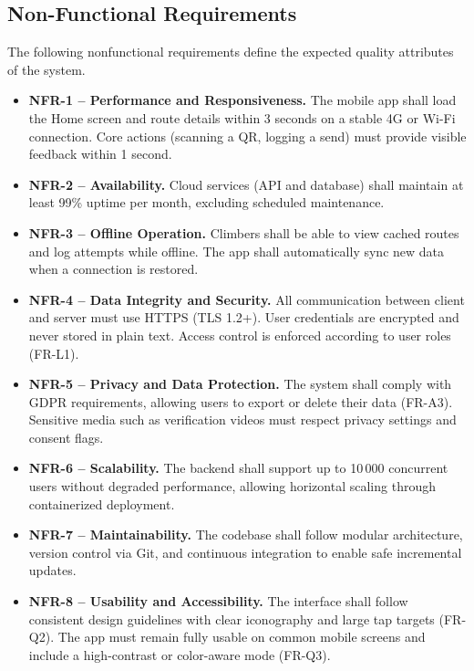 \documentclass[12pt,a4paper]{report}
\renewcommand\_{\textunderscore\hspace{0pt}}
\begin{document}
\subsection{Non-Functional Requirements}

The following nonfunctional requirements define the expected quality attributes of the system.

\begin{itemize}[leftmargin=1.2cm]

    \item \textbf{NFR-1 -- Performance and Responsiveness.}
    The mobile app shall load the Home screen and route details within 3 seconds on a stable 4G or Wi-Fi connection. Core actions (scanning a QR, logging a send) must provide visible feedback within 1 second.

    \item \textbf{NFR-2 -- Availability.}
    Cloud services (API and database) shall maintain at least 99\% uptime per month, excluding scheduled maintenance.

    \item \textbf{NFR-3 -- Offline Operation.}
    Climbers shall be able to view cached routes and log attempts while offline. The app shall automatically sync new data when a connection is restored.

    \item \textbf{NFR-4 -- Data Integrity and Security.}
    All communication between client and server must use HTTPS (TLS 1.2+). User credentials are encrypted and never stored in plain text. Access control is enforced according to user roles (FR-L1).

    \item \textbf{NFR-5 -- Privacy and Data Protection.}
    The system shall comply with GDPR requirements, allowing users to export or delete their data (FR-A3). Sensitive media such as verification videos must respect privacy settings and consent flags.

    \item \textbf{NFR-6 -- Scalability.}
    The backend shall support up to 10\,000 concurrent users without degraded performance, allowing horizontal scaling through containerized deployment.

    \item \textbf{NFR-7 -- Maintainability.}
    The codebase shall follow modular architecture, version control via Git, and continuous integration to enable safe incremental updates.

    \item \textbf{NFR-8 -- Usability and Accessibility.}
    The interface shall follow consistent design guidelines with clear iconography and large tap targets (FR-Q2). The app must remain fully usable on common mobile screens and include a high-contrast or color-aware mode (FR-Q3).


\end{itemize}
\end{document}

